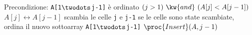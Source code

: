 \begin{codebox}
\zi	\Comment Precondizione: \texttt{A[1$\twodots$j-1]} è ordinato
\li	\If $(j > 1) \ \kw{and} \ (A[j] < A[j-1])$
\li		\Then
			$A[j] \leftrightarrow A[j-1]$
		\Comment scambia le celle \texttt{j} e \texttt{j-1}
\zi		\Comment se le celle sono state scambiate, ordina 
\zi		\Comment il nuovo sottoarray \texttt{A[1$\twodots$j-1]}
\li			$\proc{Insert}(A,j-1)$
		\End
\end{codebox}